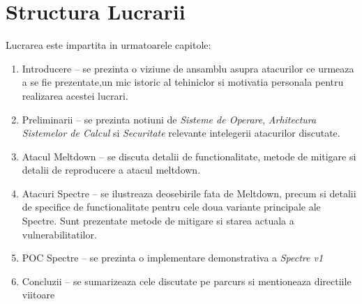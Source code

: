\section{Structura Lucrarii}

Lucrarea este impartita in urmatoarele capitole:

\begin{enumerate}
  \item Introducere -- se prezinta o viziune de ansamblu asupra atacurilor
    ce urmeaza a se fie prezentate,un mic istoric al tehiniclor si motivatia
    personala pentru realizarea acestei lucrari.
  \item Preliminarii -- se prezinta notiuni de \emph{Sisteme de Operare},
    \emph{Arhitectura Sistemelor de Calcul} si \emph{Securitate} relevante
    intelegerii atacurilor discutate.
  \item Atacul Meltdown -- se discuta detalii de functionalitate, metode de mitigare
    si detalii de reproducere a atacul meltdown.
  \item Atacuri Spectre -- se ilustreaza deosebirile fata de Meltdown, precum si
    detalii de specifice de functionalitate pentru cele doua variante principale ale
    Spectre. Sunt prezentate metode de mitigare si starea actuala a
    vulnerabilitatilor.
  \item POC Spectre -- se prezinta o implementare demonstrativa a \emph{Spectre v1}
  \item Concluzii -- se sumarizeaza cele discutate pe parcurs si mentioneaza
    directiile viitoare
\end{enumerate}
